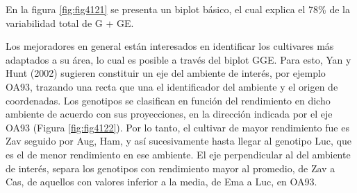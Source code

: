 En la figura \ref{fig:fig4121} se presenta un biplot básico, el cual explica el 78\% de la variabilidad total de G + GE. 


Los mejoradores en general están interesados en identificar los cultivares más adaptados a su área, lo cual es posible a través del biplot GGE. Para esto, Yan y Hunt (2002) sugieren constituir un eje del ambiente de interés, por ejemplo OA93, trazando una recta que una el identificador del ambiente y el origen de coordenadas. Los genotipos se  clasifican en función del rendimiento en dicho ambiente de acuerdo con sus proyecciones, en la dirección indicada por el eje OA93 (Figura \ref{fig:fig4122}). Por lo tanto, el cultivar de mayor rendimiento fue es Zav seguido por Aug, Ham, y así sucesivamente hasta llegar al genotipo Luc, que es el de menor rendimiento en ese ambiente. El eje perpendicular al del ambiente de interés, separa los genotipos con rendimiento mayor al promedio, de Zav a Cas, de aquellos con valores inferior a la media, de Ema a Luc, en OA93.

